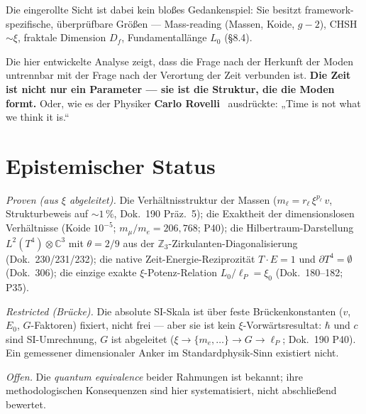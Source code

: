 \documentclass[11pt,a4paper]{article}
\begin{document}
Die eingerollte Sicht ist dabei kein bloßes Gedankenspiel: Sie besitzt framework-spezifische, überprüfbare Größen --- Mass-reading (Massen, Koide, $g-2$), CHSH~$\sim\xi$, fraktale Dimension $D_f$, Fundamentallänge $L_0$ (§8.4).

Die hier entwickelte Analyse zeigt, dass die Frage nach der Herkunft der Moden untrennbar mit der Frage nach der Verortung der Zeit verbunden ist. \textbf{Die Zeit ist nicht nur ein Parameter --- sie ist die Struktur, die die Moden formt.} Oder, wie es der Physiker \textbf{Carlo Rovelli}~\cite{Rovelli2009} ausdrückte: „Time is not what we think it is.``

\section{Epistemischer Status}

\emph{Proven (aus $\xi$ abgeleitet).} Die Verhältnisstruktur der Massen ($m_\ell=r_\ell\,\xi^{p_\ell}\,v$, Strukturbeweis auf ${\sim}1\,\%$, Dok.~190 Präz.~5); die Exaktheit der dimensionslosen Verhältnisse (Koide $10^{-5}$; $m_\mu/m_e=206{,}768$; P40); die Hilbertraum-Darstellung $L^2(T^4)\otimes\mathbb{C}^3$ mit $\theta=2/9$ aus der $\mathbb{Z}_3$-Zirkulanten-Diagonalisierung (Dok.~230/231/232); die native Zeit-Energie-Reziprozität $T\cdot E=1$ und $\partial T^4=\emptyset$ (Dok.~306); die einzige exakte $\xi$-Potenz-Relation $L_0/\ell_P=\xi_0$ (Dok.~180--182; P35).

\emph{Restricted (Brücke).} Die absolute SI-Skala ist über feste Brückenkonstanten ($v$, $E_0$, $G$-Faktoren) fixiert, nicht frei --- aber sie ist kein $\xi$-Vorwärtsresultat: $\hbar$ und $c$ sind SI-Umrechnung, $G$ ist abgeleitet ($\xi\to\{m_e,\dots\}\to G\to\ell_P$; Dok.~190 P40). Ein gemessener dimensionaler Anker im Standardphysik-Sinn existiert nicht.

\emph{Offen.} Die \emph{quantum equivalence} beider Rahmungen ist bekannt; ihre methodologischen Konsequenzen sind hier systematisiert, nicht abschließend bewertet.
\end{document}
